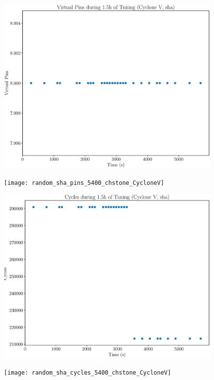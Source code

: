 \documentclass[12pt, a4paper]{article}
\begin{document}
\begin{figure}[htpb]
    \begin{minipage}{.48\textwidth}
        \includegraphics[scale=.25]{sha_pins_5400_chstone_CycloneV}
    \end{minipage}%
    \hfill
    \begin{minipage}{.48\textwidth}
        \texttt{[image: random\_sha\_pins\_5400\_chstone\_CycloneV]}
    \end{minipage}%

    \begin{minipage}{.48\textwidth}
        \includegraphics[scale=.25]{sha_cycles_5400_chstone_CycloneV}
    \end{minipage}%
    \hfill
    \begin{minipage}{.48\textwidth}
        \texttt{[image: random\_sha\_cycles\_5400\_chstone\_CycloneV]}
    \end{minipage}%
\end{figure}
\end{document}
